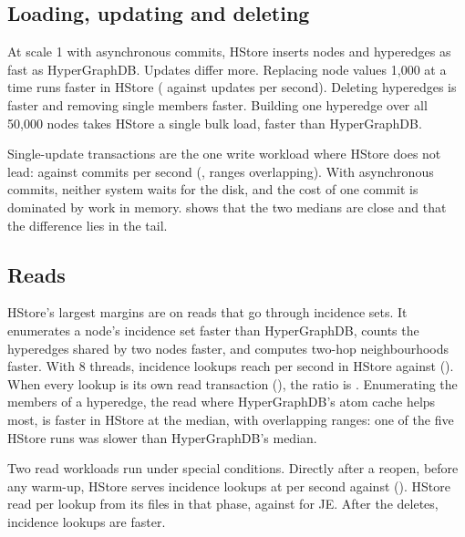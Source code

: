 \subsection{Loading, updating and deleting}

At scale 1 with asynchronous commits, HStore inserts nodes  and hyperedges  as fast as HyperGraphDB. Updates differ more. Replacing node values 1,000 at a time runs  faster in HStore ( against  updates per second). Deleting hyperedges is  faster and removing single members  faster. Building one hyperedge over all 50,000 nodes takes HStore a single bulk load,  faster than HyperGraphDB.

Single-update transactions are the one write workload where HStore does not lead:  against  commits per second (, ranges overlapping). With asynchronous commits, neither system waits for the disk, and the cost of one commit is dominated by work in memory.  shows that the two medians are close and that the difference lies in the tail.

\subsection{Reads}

HStore's largest margins are on reads that go through incidence sets. It enumerates a node's incidence set  faster than HyperGraphDB, counts the hyperedges shared by two nodes  faster, and computes two-hop neighbourhoods  faster. With 8 threads, incidence lookups reach  per second in HStore against  (). When every lookup is its own read transaction (), the ratio is . Enumerating the members of a hyperedge, the read where HyperGraphDB's atom cache helps most, is  faster in HStore at the median, with overlapping ranges: one of the five HStore runs was slower than HyperGraphDB's median.

Two read workloads run under special conditions. Directly after a reopen, before any warm-up, HStore serves incidence lookups at  per second against  (). HStore read  per lookup from its files in that phase, against  for JE. After the deletes, incidence lookups are  faster.

